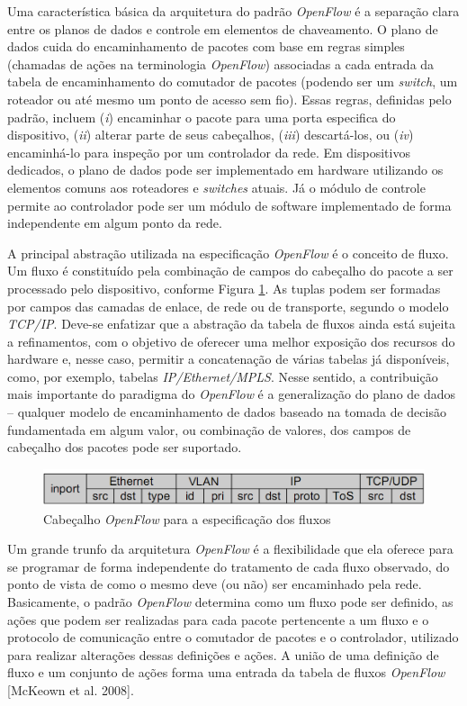Uma característica básica da arquitetura do padrão \textit{OpenFlow} 
é a separação clara entre os planos de dados e controle em
elementos de chaveamento. O plano de dados cuida do 
encaminhamento de pacotes com base em regras simples (chamadas de ações na terminologia \textit{OpenFlow}) associadas
a cada entrada da tabela de encaminhamento do comutador 
de pacotes (podendo ser um \textit{switch}, um roteador 
ou até mesmo um ponto de acesso sem fio).
Essas regras, definidas pelo padrão, incluem (\textit{i}) 
encaminhar o pacote para uma porta especifica do dispositivo,
(\textit{ii}) alterar parte de seus cabeçalhos, (\textit{iii}) 
descartá-los, ou (\textit{iv}) encaminhá-lo para inspeção 
por um controlador da rede. Em dispositivos dedicados, o plano
de dados pode ser implementado em hardware utilizando os
elementos comuns aos roteadores e \textit{switches} atuais.
Já o módulo de controle permite ao controlador pode ser um 
módulo de software implementado de forma independente em
algum ponto da rede.

A principal abstração utilizada na especificação
\textit{OpenFlow} é o conceito
de fluxo. Um fluxo é constituído pela combinação de campos
do cabeçalho do pacote a ser processado pelo dispositivo,
conforme Figura \ref{fig:cabecalhoOpenflow}. As tuplas podem
ser formadas por campos das camadas de enlace, de rede ou de
transporte, segundo o modelo \textit{TCP/IP}. Deve-se
enfatizar que a abstração da tabela de fluxos ainda está sujeita a
refinamentos, com o objetivo de oferecer uma melhor
exposição dos recursos do hardware e, nesse caso, permitir a
concatenação de várias tabelas já disponíveis, como, por
exemplo, tabelas \textit{IP/Ethernet/MPLS}. Nesse sentido, a
contribuição mais importante do paradigma do
\textit{OpenFlow} é a generalização do plano
de dados – qualquer modelo de encaminhamento de dados
baseado na tomada de decisão fundamentada em algum valor, ou
combinação de valores, dos campos de cabeçalho dos pacotes
pode ser suportado.

\begin{figure}[hb] \centering
\includegraphics[width=160mm]{cabecalhoOpenflow.png}
\caption{Cabeçalho \textit{OpenFlow} para a especificação dos fluxos}
\label{fig:cabecalhoOpenflow}
\end{figure}

Um grande trunfo da arquitetura \textit{OpenFlow} é a flexibilidade 
que ela oferece para se programar de forma independente do
tratamento de cada fluxo observado, do ponto de vista de como
o mesmo deve (ou não) ser encaminhado pela rede. Basicamente,
o padrão \textit{OpenFlow} determina como um fluxo pode ser definido,
as ações que podem ser realizadas para cada pacote pertencente
a um fluxo e o protocolo de comunicação entre o comutador de 
pacotes e o controlador, utilizado para realizar alterações dessas 
definições e ações. A união de uma definição de fluxo e um
conjunto de ações forma uma entrada da tabela de fluxos 
\textit{OpenFlow} [McKeown et al. 2008].

